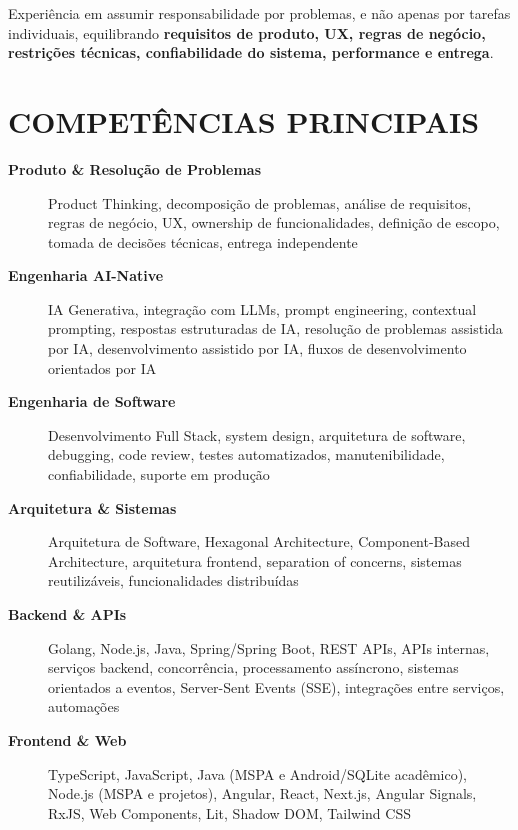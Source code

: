 \documentclass[10pt,a4paper]{article}
\begin{document}
Experiência em assumir responsabilidade por problemas, e não apenas
por tarefas individuais, equilibrando \textbf{requisitos de produto,
UX, regras de negócio, restrições técnicas, confiabilidade do sistema,
performance e entrega}.


\section*{COMPETÊNCIAS PRINCIPAIS}

\footnotesize

\begin{description}

    \item[\textbf{Produto \& Resolução de Problemas}]
    Product Thinking, decomposição de problemas, análise de requisitos,
    regras de negócio, UX, ownership de funcionalidades,
    definição de escopo, tomada de decisões técnicas,
    entrega independente

    \item[\textbf{Engenharia AI-Native}]
    IA Generativa, integração com LLMs, prompt engineering,
    contextual prompting, respostas estruturadas de IA,
    resolução de problemas assistida por IA,
    desenvolvimento assistido por IA,
    fluxos de desenvolvimento orientados por IA

    \item[\textbf{Engenharia de Software}]
    Desenvolvimento Full Stack, system design,
    arquitetura de software, debugging, code review,
    testes automatizados, manutenibilidade,
    confiabilidade, suporte em produção

    \item[\textbf{Arquitetura \& Sistemas}]
    Arquitetura de Software, Hexagonal Architecture,
    Component-Based Architecture, arquitetura frontend,
    separation of concerns, sistemas reutilizáveis,
    funcionalidades distribuídas

    \item[\textbf{Backend \& APIs}]
    Golang, Node.js, Java, Spring/Spring Boot, REST APIs, APIs internas, serviços backend,
    concorrência, processamento assíncrono,
    sistemas orientados a eventos,
    Server-Sent Events (SSE), integrações entre serviços,
    automações

    \item[\textbf{Frontend \& Web}]
    TypeScript, JavaScript, Java (MSPA e Android/SQLite acadêmico), Node.js (MSPA e projetos), Angular, React, Next.js,
    Angular Signals, RxJS, Web Components, Lit,
    Shadow DOM, Tailwind CSS


\end{description}
\end{document}
